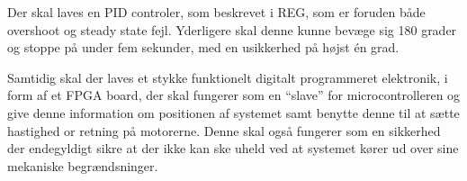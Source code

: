 Der skal laves en PID controler, som beskrevet i REG, som er foruden både overshoot og steady state fejl. Yderligere skal denne kunne bevæge sig 180 grader og stoppe på under fem sekunder, med en usikkerhed på højst én grad.

Samtidig skal der laves et stykke funktionelt digitalt programmeret elektronik, i form af et FPGA board, der skal fungerer som en ``slave'' for microcontrolleren og give denne information om positionen af systemet samt benytte denne til at sætte hastighed or retning på motorerne. Denne skal også fungerer som en sikkerhed der endegyldigt sikre at der ikke kan ske uheld ved at systemet kører ud over sine mekaniske begrændsninger.


